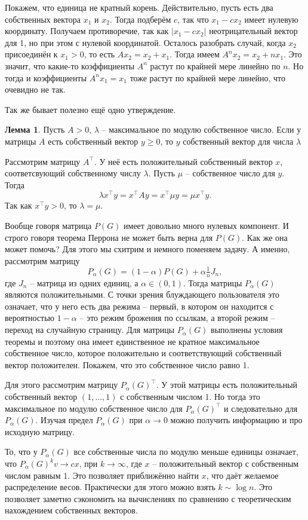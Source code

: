 \documentclass[10pt,a4paper,oneside]{book}
\theoremstyle{definition}
\newtheorem{lem}{Лемма}
\def\lm{\begin{lem}}
\def\elm{\end{lem}}
\begin{document}
Покажем, что единица не кратный корень. Действительно, пусть есть два собственных вектора $x_1$ и $x_2$. Тогда подберём $c$, так что $x_1-cx_2$ имеет нулевую координату. Получаем противоречие, так как $|x_1-cx_2|$ неотрицательный вектор для 1, но при этом с нулевой координатой. Осталось разобрать случай, когда $x_2$ присоединён к $x_1>0$, то есть $Ax_2=x_2+x_1$. Тогда имеем $A^nx_2=x_2 +nx_1$. Это значит, что какие-то коэффициенты $A^n$ растут по крайней мере линейно по $n$. Но тогда и коэффициенты $A^nx_1=x_1$ тоже растут по крайней мере линейно, что очевидно не так.
\endproof

Так же бывает полезно ещё одно утверждение. 
\lm Пусть $A>0$, $\lambda$ -- максимальное по модулю собственное число. Если у матрицы $A$ есть собственный вектор $y\geq 0$, то $y$ собственный вектор для числа $\lambda$
\elm
\proof Рассмотрим матрицу $A^{\top}$. У неё есть положительный  собственный вектор $x$, соответсвующий собственному числу $\lambda$. Пусть $\mu$ -- собственное число для $y$. Тогда 
$$\lambda x^{\top}y= x^{\top}Ay=x^{\top}\mu y=\mu x^{\top}y.$$
Так как $x^{\top}y >0$, то $\lambda=\mu$.
\endproof


Вообще говоря матрица $P(G)$ имеет довольно много нулевых компонент. И строго говоря теорема Перрона не может быть верна для $P(G)$. Как же она может помочь? Для этого мы схитрим и немного поменяем задачу. А именно, рассмотрим матрицу $$P_{\alpha}(G)=(1-\alpha) P(G) + \alpha\tfrac{1}{n}J_n,$$
где $J_n$ -- матрица из одних единиц, а $\alpha \in (0,1)$. Тогда матрицы $P_{\alpha}(G)$ являются положительными. С точки зрения блуждающего пользователя это означает, что у него есть два режима -- первый, в котором он находится с вероятностью $1-\alpha$ -- это режим брожения по ссылкам, а второй режим -- переход на случайную страницу. Для матрицы $P_{\alpha}(G)$ выполнены условия теоремы и поэтому она имеет единственное не кратное максимальное собственное число, которое положительно и соответствующий собственный вектор положителен. Покажем, что это собственное число равно 1.

Для этого рассмотрим матрицу $P_{\alpha}(G)^{\top}$. У этой матрицы есть положительный собственный вектор $(1,\dots,1)$ с собственным числом 1. Но тогда это максимальное по модулю собственное число для $P_{\alpha}(G)^{\top}$ и следовательно для $P_{\alpha}(G)$. Изучая предел $P_{\alpha}(G)$ при $\alpha \to 0$ можно получить информацию и про исходную матрицу.

То, что у $P_{\alpha}(G)$ все собственные числа по модулю меньше единицы означает, что $P_{\alpha}(G)^kv \to cx$, при $k \to \infty$, где $x$ -- положительный вектор с собственным числом равным 1. Это позволяет приближённо найти $x$, что даёт желаемое распределение весов. Практически для этого можно взять $k\sim \log n$. Это позволяет заметно сэкономить на вычислениях по сравнению с теоретическим нахождением собственных векторов.
\end{document}
